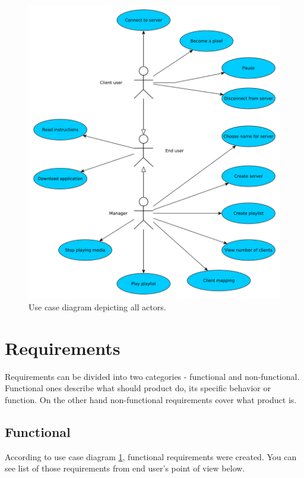 \begin{figure}[h!]
    \begin{center}
    \includegraphics[scale=0.4]{images/usecase.pdf}
    \caption{Use case diagram depicting all actors.}
    \label{img:usecase}
    \end{center}
\end{figure}

\section{Requirements}
Requirements can be divided into two categories - functional and non-functional. 
Functional ones describe what should product do, its specific behavior or function.
On the other hand non-functional requirements cover what product is.


\subsection{Functional}
According to use case diagram \ref{img:usecase}, functional requirements were created.
You can see list of those requirements from end user's point of view below.


